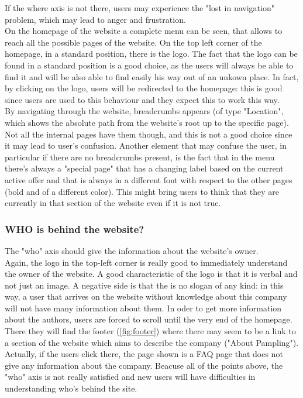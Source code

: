 If the where axis is not there, users may experience the "lost in navigation" problem, which may lead to anger and frustration.\\
On the homepage of the website a complete menu can be seen, that allows to reach all the possible pages of the website. 
On the top left corner of the homepage, in a standard position, there is the logo.
The fact that the logo can be found in a standard position is a good choice, as the users will always be able to find it
and will be also able to find easily his way out of an unkown place. In fact, by clicking on the logo, users will be redirected to the homepage: this is good since 
users are used to this behaviour and they expect this to work this way. \\
By navigating through the website, breadcrumbs appears (of type "Location", which shows the absolute path from the website's root up to the specific page).
Not all the internal pages have them though, and this is not a good choice since it may lead to user's confusion.
Another element that may confuse the user, in particular if there are no breadcrumbs present, is the fact that in the menu there's always a "special page" 
that has a changing label based on the current active offer and that is always in a 
different font with respect to the other pages (bold and of a different color). This might bring users to think that they are currently in that section of the 
website even if it is not true.

\subsubsection{WHO is behind the website?} 
The "who" axis should give the information about the website's owner.\\

Again, the logo in the top-left corner is really good to immediately understand the owner of the website. 
A good characteristic of the logo is that it is verbal and not just an image. 
A negative side is that the is no slogan of any kind: in this way, a user that arrives on the website without knowledge about this company
will not have many information about them.
In oder to get more information about the authors, users are forced to scroll until the very end of the homepage. 
There they will find the footer (\cref{fig:footer}) where there may seem to be a link to a section of the website which aims to describe the company ("About Pampling").\\
Actually, if the users click there, the page shown is a FAQ page that does not give any information about the company.
Beacuse all of the points above, the "who" axis is not really satisfied and new users will have difficulties in understanding who's behind the site.


